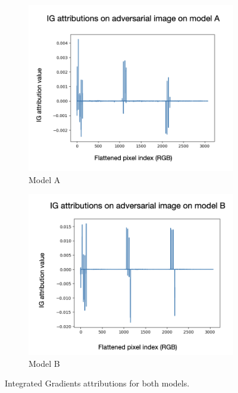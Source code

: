 \documentclass[letterpaper]{article} %
\begin{document}
\begin{figure}[h!]
\centering
\begin{subfigure}{0.48\columnwidth}
    \centering
    \includegraphics[width=\linewidth]{figures/round_1_IG_AttributionsA.png}
    \caption{Model A}
    \label{fig:ig-a}
\end{subfigure}
\hfill
\begin{subfigure}{0.48\columnwidth}
    \centering
    \includegraphics[width=\linewidth]{figures/round_1_IG_AttributionsB.png}
    \caption{Model B}
    \label{fig:ig-b}
\end{subfigure}
\caption{Integrated Gradients attributions for both models.}
\label{fig:ig-sidebyside}
\end{figure}
\end{document}
